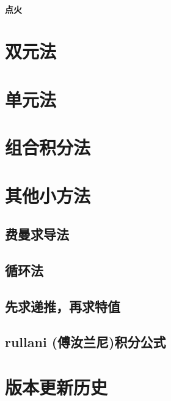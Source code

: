 \documentclass[lang=cn,newtx,10pt,scheme=chinese]{elegantbook}
\begin{document}
    \subsubsection{点火}

\chapter{双元法}
\chapter{单元法}
\chapter{组合积分法}
\chapter{其他小方法}
\section{费曼求导法}
\section{循环法}
\section{先求递推，再求特值}
\section{rullani (傅汝兰尼)积分公式}


\chapter{版本更新历史}

\end{document}
